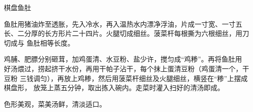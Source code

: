 \begin{recipe}{棋盘鱼肚}

\ingredients


\preparation

\step 鱼肚用猪油炸至透胀，先入冷水，再入温热水内漂净浮油，片成一寸宽、一寸五
长、二分厚的长方形片二十四片。火腿切成细丝。菠菜杆每根撕为六根细丝，用刀切成与
鱼肚相等长度。

\step 鸡脯、肥膘分别砸茸，加鸡蛋清、水豆粉、盐少许，搅匀成“鸡糁”。再将鱼肚用
好汤煨过，捞起挤干水份，再用干帕子沾干，每个抹上蛋清豆粉（鸡蛋清一个，干豆粉
三钱调匀），再放上鸡糁，然后用菠菜杆细丝及火腿细丝，横竖在“糁”上摆成棋盘形，
放笼上蒸五分钟，取出拣入碗内。走菜时灌入扫好的清汤即成。

\features

色形美观，菜美汤鲜，清淡适口。

\end{recipe}

